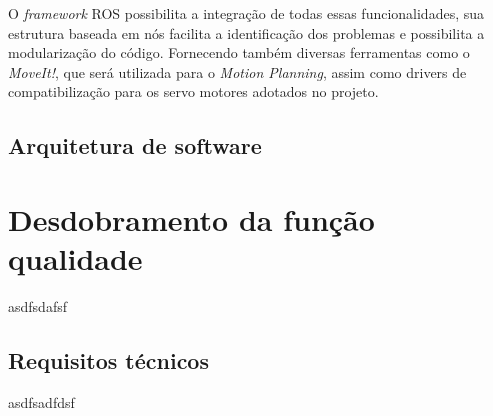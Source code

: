 O \textit{framework} ROS possibilita a integração de todas essas funcionalidades, sua estrutura baseada em nós facilita a identificação dos problemas e possibilita a modularização do código. Fornecendo também diversas ferramentas como o \textit{MoveIt!}, que será utilizada para o \textit{Motion Planning}, assim como drivers de compatibilização para os servo motores adotados no projeto.

\subsection{Arquitetura de software}
\label{ssec:arqs}

\section{Desdobramento da função qualidade}
\label{sec:qfd}
asdfsdafsf

\subsection{Requisitos técnicos}
\label{ssec:reqt}
asdfsadfdsf

